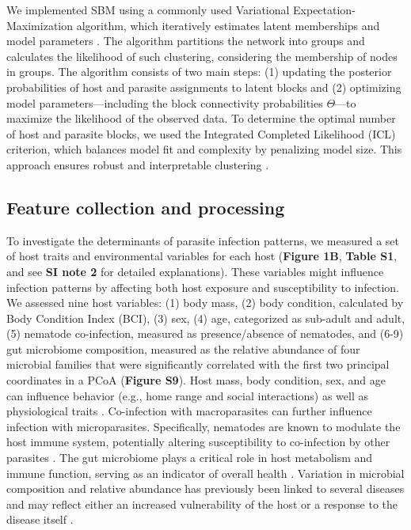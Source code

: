 \documentclass[oneside, a4paper, onecolumn, 11pt]{article}
\begin{document}
We implemented SBM using a commonly used Variational Expectation-Maximization algorithm, which iteratively estimates latent memberships and model parameters \citep{Leger2016-ab}. The algorithm partitions the network into groups and calculates the likelihood of such clustering, considering the membership of nodes in groups. The algorithm consists of two main steps: (1) updating the posterior probabilities of host and parasite assignments to latent blocks and (2) optimizing model parameters—including the block connectivity probabilities $\Theta$—to maximize the likelihood of the observed data. To determine the optimal number of host and parasite blocks, we used the Integrated Completed Likelihood (ICL) criterion, which balances model fit and complexity by penalizing model size. This approach ensures robust and interpretable clustering \citep{Leger2016-ab}.

\subsection*{Feature collection and processing}
To investigate the determinants of parasite infection patterns, we measured a set of host traits and environmental variables for each host (\textbf{Figure 1B}, \textbf{Table S1}, and see \textbf{SI note 2} for detailed explanations). These variables might influence infection patterns by affecting both host exposure and susceptibility to infection. We assessed nine host variables: (1) body mass, (2) body condition, calculated by Body Condition Index (BCI), (3) sex, (4) age, categorized as sub-adult and adult, (5) nematode co-infection, measured as presence/absence of nematodes, and (6-9) gut microbiome composition, measured as the relative abundance of four microbial families that were significantly correlated with the first two principal coordinates in a PCoA (\textbf{Figure S9}). Host mass, body condition, sex, and age can influence behavior (e.g., home range and social interactions) as well as physiological traits \citep{Grear2009-ch,Cornell2008-cx,Sanchez2018-tf}. Co-infection with macroparasites can further influence infection with microparasites. Specifically, nematodes are known to modulate the host immune system, potentially altering susceptibility to co-infection by other parasites \citep{Mabbott2018-wb,Rodgers2024-hl}. The gut microbiome plays a critical role in host metabolism and immune function, serving as an indicator of overall health \citep{Berg2020-az, Gould2018-kj}. Variation in microbial composition and relative abundance has previously been linked to several diseases and may reflect either an increased vulnerability of the host or a response to the disease itself \citep{Levy2017-ec,Rosshart2017-pu}.
\end{document}
